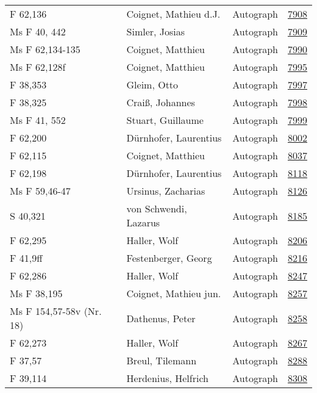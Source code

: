 \documentclass[10pt,a4paper,landscape]{report}
\begin{document}
\begin{longtable}{p{16cm}p{4cm}lr}
F 62,136	&	Coignet, Mathieu d.J.	&	Autograph	&	\href{http://130.60.24.72/assignment/7908}{7908}\\
Ms F 40, 442	&	Simler, Josias	&	Autograph	&	\href{http://130.60.24.72/assignment/7909}{7909}\\
Ms F 62,134-135	&	Coignet, Matthieu	&	Autograph	&	\href{http://130.60.24.72/assignment/7990}{7990}\\
Ms F 62,128f	&	Coignet, Matthieu	&	Autograph	&	\href{http://130.60.24.72/assignment/7995}{7995}\\
F 38,353	&	Gleim, Otto	&	Autograph	&	\href{http://130.60.24.72/assignment/7997}{7997}\\
F 38,325	&	Craiß, Johannes	&	Autograph	&	\href{http://130.60.24.72/assignment/7998}{7998}\\
Ms F 41, 552	&	Stuart, Guillaume	&	Autograph	&	\href{http://130.60.24.72/assignment/7999}{7999}\\
F 62,200	&	Dürnhofer, Laurentius	&	Autograph	&	\href{http://130.60.24.72/assignment/8002}{8002}\\
F 62,115	&	Coignet, Matthieu	&	Autograph	&	\href{http://130.60.24.72/assignment/8037}{8037}\\
F 62,198	&	Dürnhofer, Laurentius	&	Autograph	&	\href{http://130.60.24.72/assignment/8118}{8118}\\
Ms F 59,46-47	&	Ursinus, Zacharias	&	Autograph	&	\href{http://130.60.24.72/assignment/8126}{8126}\\
S 40,321	&	von Schwendi, Lazarus	&	Autograph	&	\href{http://130.60.24.72/assignment/8185}{8185}\\
F 62,295	&	Haller, Wolf	&	Autograph	&	\href{http://130.60.24.72/assignment/8206}{8206}\\
F 41,9ff	&	Festenberger, Georg	&	Autograph	&	\href{http://130.60.24.72/assignment/8216}{8216}\\
F 62,286	&	Haller, Wolf	&	Autograph	&	\href{http://130.60.24.72/assignment/8247}{8247}\\
Ms F 38,195	&	Coignet, Mathieu jun.	&	Autograph	&	\href{http://130.60.24.72/assignment/8257}{8257}\\
Ms F 154,57-58v (Nr. 18)	&	Dathenus, Peter	&	Autograph	&	\href{http://130.60.24.72/assignment/8258}{8258}\\
F 62,273	&	Haller, Wolf	&	Autograph	&	\href{http://130.60.24.72/assignment/8267}{8267}\\
F 37,57	&	Breul, Tilemann	&	Autograph	&	\href{http://130.60.24.72/assignment/8288}{8288}\\
F 39,114	&	Herdenius, Helfrich	&	Autograph	&	\href{http://130.60.24.72/assignment/8308}{8308}\\

\end{longtable}
\end{document}
